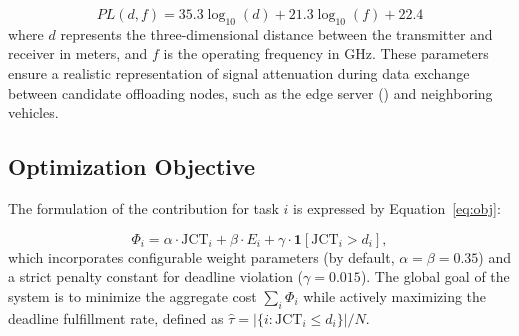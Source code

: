 \begin{equation}
\label{eq:pathloss}
PL(d, f) = 35.3 \log_{10}(d) + 21.3 \log_{10}(f) + 22.4
\end{equation}
where $d$ represents the three-dimensional distance between the transmitter and receiver in meters, and $f$ is the operating frequency in \unit{\giga\hertz}. These parameters ensure a realistic representation of signal attenuation during data exchange between candidate offloading nodes, such as the edge server () and neighboring vehicles.

\subsection{Optimization Objective}

The formulation of the  contribution for task $i$ is expressed by Equation~\ref{eq:obj}:

\begin{equation}
\label{eq:obj}
\Phi_i = \alpha \cdot \mathrm{JCT}_i + \beta \cdot E_i + \gamma \cdot \mathbf{1}[\mathrm{JCT}_i > d_i],
\end{equation}
which incorporates configurable weight parameters (by default, $\alpha = \beta = 0.35$) and a strict penalty constant for deadline violation ($\gamma = 0.015$). The global goal of the system is to minimize the aggregate cost $\sum_i \Phi_i$ while actively maximizing the deadline fulfillment rate, defined as $\hat{\tau} = |\{i : \mathrm{JCT}_i \le d_i\}| / N$.
